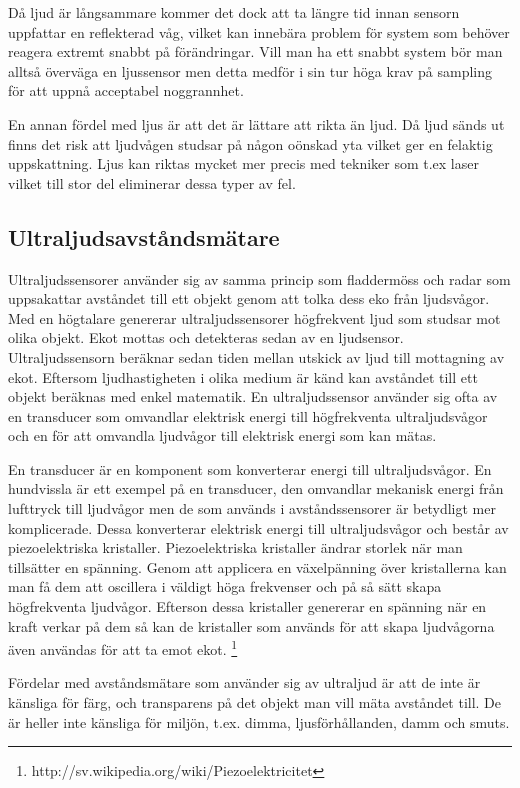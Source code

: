 \documentclass[a4paper,12pt,fleqn]{article}
\begin{document}
Då ljud är långsammare kommer det dock att ta längre tid innan sensorn uppfattar en reflekterad våg, vilket kan innebära problem för system som behöver reagera extremt snabbt på förändringar. Vill man ha ett snabbt system bör man alltså överväga en ljussensor men detta medför i sin tur höga krav på sampling för att uppnå acceptabel noggrannhet.

En annan fördel med ljus är att det är lättare att rikta än ljud. Då ljud sänds ut finns det risk att ljudvågen studsar på någon oönskad yta vilket ger en felaktig uppskattning.
Ljus kan riktas mycket mer precis med tekniker som t.ex laser vilket till stor del eliminerar dessa typer av fel.



\subsection{Ultraljudsavståndsmätare}
Ultraljudssensorer använder sig av samma princip som fladdermöss och radar som uppsakattar avståndet till ett objekt genom att tolka dess eko från ljudsvågor. Med en högtalare genererar ultraljudssensorer högfrekvent ljud som studsar mot olika objekt. Ekot mottas och detekteras sedan av en ljudsensor. Ultraljudssensorn beräknar sedan tiden mellan utskick av ljud till mottagning av ekot. Eftersom ljudhastigheten i olika medium är känd kan avståndet till ett objekt beräknas med enkel matematik. En ultraljudssensor använder sig ofta av en transducer som omvandlar elektrisk energi till högfrekventa ultraljudsvågor och en för att omvandla ljudvågor till elektrisk energi som kan mätas.

En transducer är en komponent som konverterar energi till ultraljudsvågor. En hundvissla är ett exempel på en transducer, den omvandlar mekanisk energi från lufttryck till ljudvågor men de som används i avståndssensorer är betydligt mer komplicerade. Dessa konverterar elektrisk energi till ultraljudsvågor och består av piezoelektriska kristaller. Piezoelektriska kristaller ändrar storlek när man tillsätter en spänning. Genom att applicera en växelpänning över kristallerna kan man få dem att oscillera i väldigt höga frekvenser och på så sätt skapa högfrekventa ljudvågor. Efterson dessa kristaller genererar en spänning när en kraft verkar på dem så kan de kristaller som används för att skapa ljudvågorna även användas för att ta emot ekot.
\footnote{http://sv.wikipedia.org/wiki/Piezoelektricitet}

Fördelar med avståndsmätare som använder sig av ultraljud är att de inte är känsliga för färg, och transparens på det objekt man vill mäta avståndet till. De är heller inte känsliga för miljön, t.ex. dimma, ljusförhållanden, damm och smuts.
\end{document}
